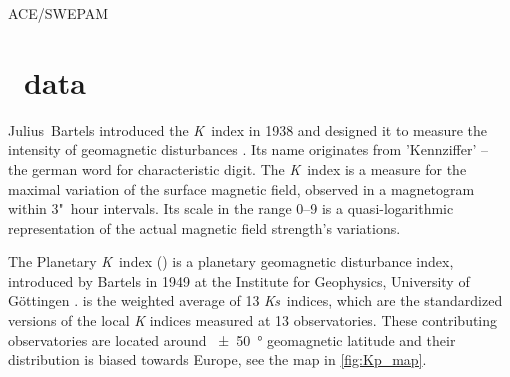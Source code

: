 ACE/SWEPAM\\	%


\section{\Kp{}~data}
\label{sec:kp_data}
Julius~Bartels introduced the \textit{K}~index in 1938 and designed it to measure the intensity of geomagnetic disturbances \citep{Bartels1939}. Its name originates from 'Kennziffer' -- the german word for characteristic digit. The \textit{K}~index is a measure for the maximal variation of the surface magnetic field, observed in a magnetogram within 3"~hour intervals. Its scale in the range 0--9 is a quasi-logarithmic representation of the actual magnetic field strength's variations.

The Planetary \textit{K}~index (\Kp{}) is a planetary geomagnetic disturbance index, introduced by Bartels in 1949 at the Institute for Geophysics, University of Göttingen \citep{Bartels1949}. \Kp{} is the weighted average of 13 \textit{Ks}~indices, which are the standardized versions of the local \textit{K} indices measured at 13 observatories. These contributing observatories are located around \SI{+-50}{\degree} geomagnetic latitude and their distribution is biased towards Europe, see the map in \autoref{fig:Kp_map}.
\begin{figure}[htb]
\end{figure}

